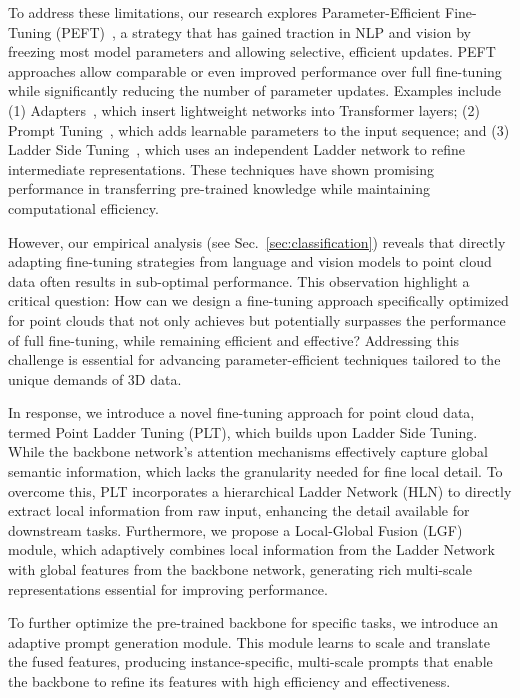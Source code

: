 To address these limitations, our research explores Parameter-Efficient Fine-Tuning (PEFT)~\cite{houlsby2019parameter, jie2023fact, karimi2021compacter}, a strategy that has gained traction in NLP and vision by freezing most model parameters and allowing selective, efficient updates. PEFT approaches allow comparable or even improved performance over full fine-tuning while significantly reducing the number of parameter updates. Examples include (1) Adapters~\cite{houlsby2019parameter, chen2022adaptformer}, which insert lightweight networks into Transformer layers; (2) Prompt Tuning~\cite{li2021prefix, lester-etal-2021-power}, which adds learnable parameters to the input sequence; and (3) Ladder Side Tuning~\cite{sung2022lst}, which uses an independent Ladder network to refine intermediate representations. These techniques have shown promising performance in transferring pre-trained knowledge while maintaining computational efficiency.

However, our empirical analysis (see Sec.~\ref{sec:classification}) reveals that directly adapting fine-tuning strategies from language and vision models to point cloud data often results in sub-optimal performance. This observation highlight a critical question: How can we design a fine-tuning approach specifically optimized for point clouds that not only achieves but potentially surpasses the performance of full fine-tuning, while remaining efficient and effective? Addressing this challenge is essential for advancing parameter-efficient techniques tailored to the unique demands of 3D data.

In response, we introduce a novel fine-tuning approach for point cloud data, termed Point Ladder Tuning (PLT), which builds upon Ladder Side Tuning. While the backbone network’s attention mechanisms effectively capture global semantic information, which lacks the granularity needed for fine local detail. To overcome this, PLT incorporates a hierarchical Ladder Network (HLN) to directly extract local information from raw input, enhancing the detail available for downstream tasks. Furthermore, we propose a Local-Global Fusion (LGF) module, which adaptively combines local information from the Ladder Network with global features from the backbone network, generating rich multi-scale representations essential for improving performance.


To further optimize the pre-trained backbone for specific tasks, we introduce an adaptive prompt generation module. This module learns to scale and translate the fused features, producing instance-specific, multi-scale prompts that enable the backbone to refine its features with high efficiency and effectiveness.

